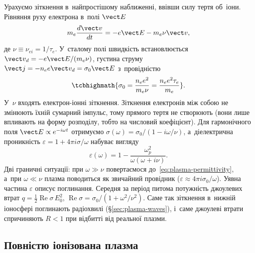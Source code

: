 Урахуємо зіткнення в~найпростішому наближенні, ввівши силу тертя об~іони. Рівняння руху
електрона в~полі $\vect E$
\begin{equation*}
	m_e\frac{d\vect v}{dt}=-e\vect E-m_e\nu\vect v,
\end{equation*}
де $\nu\equiv\nu_{ei}=1/\tau_e$. У~сталому полі швидкість встановлюється $\vect
v_d=-e\vect E/(m_e\nu)$, густина струму $\vect j=-n_ee\vect v_d=\sigma_0\vect E$
з~провідністю
\begin{equation}\label{eq:drude}
	\tcbhighmath{\sigma_0=\frac{n_ee^2}{m_e\nu}=\frac{n_ee^2\tau_e}{m_e}}.
\end{equation}
У~$\nu$ входять електрон-іонні зіткнення. Зіткнення електронів між собою не змінюють їхній
сумарний імпульс, тому прямого тертя не створюють (вони лише впливають на форму розподілу,
тобто на числовий коефіцієнт). Для гармонічного поля $\vect E\propto e^{-i\omega t}$
отримуємо $\sigma(\omega)=\sigma_0/(1-i\omega/\nu)$, а~діелектрична проникність
$\varepsilon=1+4\pi i\sigma/\omega$ набуває вигляду
\begin{equation}\label{eq:eps-collisions}
	\varepsilon(\omega)=1-\frac{\omega_p^2}{\omega(\omega+i\nu)}.
\end{equation}
Дві граничні ситуації: при $\omega\gg\nu$ повертаємося до~\eqref{eq:plasma-permittivity},
а~при $\omega\ll\nu$ плазма поводиться як звичайний провідник ($\varepsilon\approx4\pi
i\sigma_0/\omega$). Уявна частина $\varepsilon$ описує поглинання. Середня за період
питома потужність джоулевих втрат $q=\tfrac12\operatorname{Re}\sigma\,E_0^2$,
$\operatorname{Re}\sigma=\sigma_0/(1+\omega^2/\nu^2)$. Саме так зіткнення в~нижній
іоносфері поглинають радіохвилі (§\ref{sec:plasma-waves}), і~саме джоулеві втрати
спричиняють $R<1$ при відбитті від реальної плазми.



\subsection{Повністю іонізована плазма}



